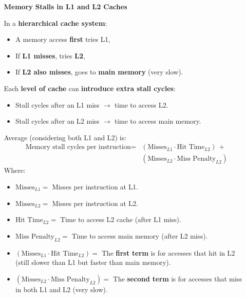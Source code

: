 \begin{flushleft}
    \textcolor{Red2}{ \textbf{Memory Stalls in L1 and L2 Caches}}
\end{flushleft}
In a \textbf{hierarchical cache system}:
\begin{itemize}
    \item A memory access \textbf{first} tries L1,
    \item If \textbf{L1 misses}, tries \textbf{L2},
    \item If \textbf{L2 also misses}, goes to \textbf{main memory} (very slow).
\end{itemize}
Each \textbf{level of cache} can \textbf{introduce extra stall cycles}:
\begin{itemize}
    \item Stall cycles after an L1 miss $\rightarrow$ time to access L2.
    \item Stall cycles after an L2 miss $\rightarrow$ time to access main memory.
\end{itemize}
Average  (considering both L1 and L2) is:
\begin{equation}
    \begin{array}{rl}
        \text{Memory stall cycles per instruction} =& (\text{Misses}_{L1} \cdot \text{Hit Time}_{L2})\, + \\ [.5em]
        & (\text{Misses}_{L2} \cdot \text{Miss Penalty}_{L2})
    \end{array}
\end{equation}
Where:
\begin{itemize}
    \item $\text{Misses}_{L1} =$ Misses per instruction at L1.
    \item $\text{Misses}_{L2} =$ Misses per instruction at L2.
    \item $\text{Hit Time}_{L2} =$ Time to access L2 cache (after L1 miss).
    \item $\text{Miss Penalty}_{L2} =$ Time to access main memory (after L2 miss).
    \item $(\text{Misses}_{L1} \cdot \text{Hit Time}_{L2}) =$ The \textbf{first term} is for accesses that hit in L2 (still slower than L1 but faster than main memory).
    \item $(\text{Misses}_{L2} \cdot \text{Miss Penalty}_{L2}) =$ The \textbf{second term} is for accesses that miss in both L1 and L2 (very slow).
\end{itemize}
